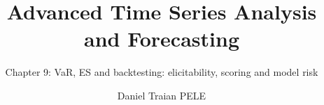 \title[Advanced Time Series Analysis and Forecasting]{Advanced Time Series Analysis and Forecasting}
\subtitle{Chapter 9: VaR, ES and backtesting: elicitability, scoring and model risk}
\author[D.T. Pele]{Daniel Traian PELE}
\date{}

\providecommand{\atsapplink}[3]{\hypertarget{#2}{}\hyperlink{#1}{\beamergotobutton{#3}}}  %
\providecommand{\atsappback}[2]{\begin{tikzpicture}[remember picture,overlay]\node[anchor=south east] at ([xshift=-3mm,yshift=7mm]current page.south east){\hyperlink{#1}{\beamerreturnbutton{#2}}};\end{tikzpicture}}  %
\providecommand{\atschlink}[2]{\href{#1}{#2}}  %
\providecommand{\atschlinkt}[2]{\href{#1}{\usebeamercolor[fg]{frametitle}#2}}  %



